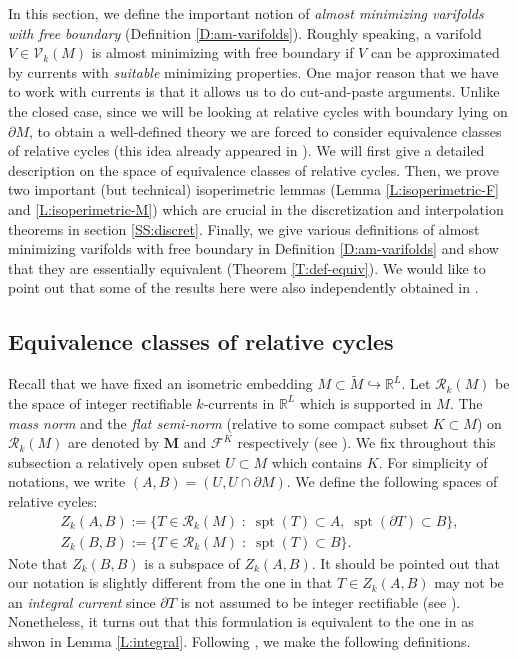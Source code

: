 \documentclass[10pt]{amsart}
\theoremstyle{definition}
\theoremstyle{remark}
\numberwithin{equation}{section}
\newcommand{\V}{\mathcal{V}}
\newcommand{\F}{\mathcal{F}}
\newcommand{\M}{\mathbf{M}}
\newcommand{\mR}{\mathcal{R}}
\newcommand{\tM}{\widetilde{M}}
\newcommand{\spt}{\operatorname{spt}}
\begin{document}
In this section, we define the important notion of \emph{almost minimizing varifolds with free boundary} (Definition \ref{D:am-varifolds}). Roughly speaking, a varifold $V \in \V_k(M)$ is almost minimizing with free boundary if $V$ can be approximated by currents with \emph{suitable} minimizing properties. One major reason that we have to work with currents is that it allows us to do cut-and-paste arguments. Unlike the closed case, since we will be looking at relative cycles with boundary lying on $\partial M$, to obtain a well-defined theory we are forced to consider equivalence classes of relative cycles (this idea already appeared in \cite{Almgren62}). We will first give a detailed description on the space of equivalence classes of relative cycles. Then, we prove two important (but technical) isoperimetric lemmas (Lemma \ref{L:isoperimetric-F} and \ref{L:isoperimetric-M}) which are crucial in the discretization and interpolation theorems in section \ref{SS:discret}. Finally, we give various definitions of almost minimizing varifolds with free boundary in Definition \ref{D:am-varifolds} and show that they are essentially equivalent (Theorem \ref{T:def-equiv}). We would like to point out that some of the results here were also independently obtained in \cite{Liokumovich-Marques-Neves}.


\subsection{Equivalence classes of relative cycles}
\label{SS:relative-cycles}

Recall that we have fixed an isometric embedding $M \subset \tM \hookrightarrow \mathbb{R}^L$. Let $\mR_k(M)$ be the space of integer rectifiable $k$-currents in $\mathbb{R}^L$ which is supported in $M$. The \emph{mass norm} and the \emph{flat semi-norm} (relative to some compact subset $K \subset M$) on $\mR_k(M)$ are denoted by $\M$ and $\F^K$ respectively (see \cite{Simon}). We fix throughout this subsection a relatively open subset $U \subset M$ which contains $K$. For simplicity of notations, we write $(A,B)=(U, U \cap \partial M)$. We define the following spaces of relative cycles:
\begin{equation}
\label{E:relative-cycles}
\begin{array}{c} 
Z_k(A, B):= \{T \in \mR_k(M) \; : \; \spt(T) \subset A, \; \spt(\partial T) \subset B\},\\
Z_k(B, B):= \{ T \in \mR_k(M) \; : \; \spt(T) \subset B\}.
\end{array}
\end{equation}
Note that $Z_k(B,B)$ is a subspace of $Z_k(A,B)$. It should be pointed out that our notation is slightly different from the one in \cite[(1.20)]{Almgren62} that $T \in Z_k(A,B)$ may not be an \emph{integral current} since $\partial T$ is not assumed to be integer rectifiable (see \cite[Remark 1.21]{Almgren62}). Nonetheless, it turns out that this formulation is equivalent to the one in \cite{Almgren62} as shwon in Lemma \ref{L:integral}. Following \cite[(1.20)]{Almgren62}, we make the following definitions.
\end{document}
